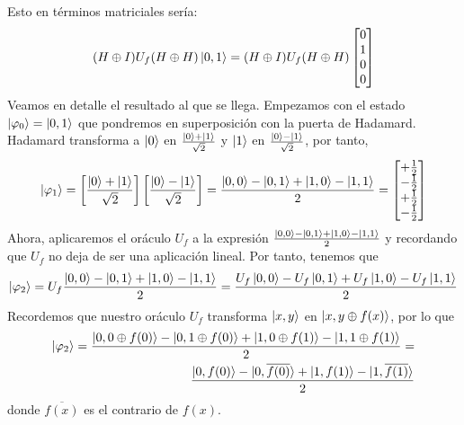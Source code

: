 \documentclass[a4paper]{article}
\numberwithin{equation}{section}
\begin{document}
Esto en términos matriciales sería:
\begin{equation}
(H\oplus I) U_f (H\oplus H) \ket{0, 1} = 
(H\oplus I) U_f (H\oplus H)
\begin{bmatrix}
0 \\ 1 \\ 0 \\ 0
\end{bmatrix}
\end{equation}
Veamos en detalle el resultado al que se llega. Empezamos con el estado $\ket{\varphi_0} = \ket{0, 1}$ que pondremos en superposición con la puerta de Hadamard.
Hadamard transforma a $\ket{0}$ en $\frac{\ket{0} + \ket{1}}{\sqrt{2}}$ y $\ket{1}$ en $\frac{\ket{0} - \ket{1}}{\sqrt{2}}$, por tanto,
\begin{equation}
\ket{\varphi_1} = \left[ \frac{\ket{0} + \ket{1}}{\sqrt{2}} \right] \left[ \frac{\ket{0} - \ket{1}}{\sqrt{2}} \right] =
\frac{\ket{0,0} - \ket{0,1} + \ket{1,0} - \ket{1,1}}{2} = 
\begin{bmatrix}
+\frac{1}{2} \\ -\frac{1}{2} \\ +\frac{1}{2} \\ -\frac{1}{2}
\end{bmatrix}
\end{equation}
Ahora, aplicaremos el oráculo $U_f$ a la expresión $\frac{\ket{0,0} - \ket{0,1} + \ket{1,0} - \ket{1,1}}{2}$ y recordando que $U_f$ no deja de ser una aplicación lineal. Por tanto, tenemos que
\begin{equation}
\ket{\varphi_2} = U_f \frac{\ket{0,0} - \ket{0,1} + \ket{1,0} - \ket{1,1}}{2} = \frac{U_f\ket{0,0} - U_f\ket{0,1} + U_f\ket{1,0} - U_f\ket{1,1}}{2} 
\end{equation}
Recordemos que nuestro oráculo $U_f$ transforma $\ket{x,y}$ en $\ket{x,y\oplus f(x)}$, por lo que
\begin{equation}
\begin{split}
\ket{\varphi_2} =
\frac{\ket{0,0\oplus f(0)} - \ket{0,1\oplus f(0)} + \ket{1, 0\oplus f(1)} - \ket{1, 1\oplus f(1)}}{2} = \\
\frac{\ket{0,f(0)} - \ket{0,\overline{f(0)}} + \ket{1,f(1)} - \ket{1,\overline{f(1)}}}{2}
\end{split}
\end{equation}
donde $\overline{f(x)}$ es el contrario de $f(x)$.
\end{document}
